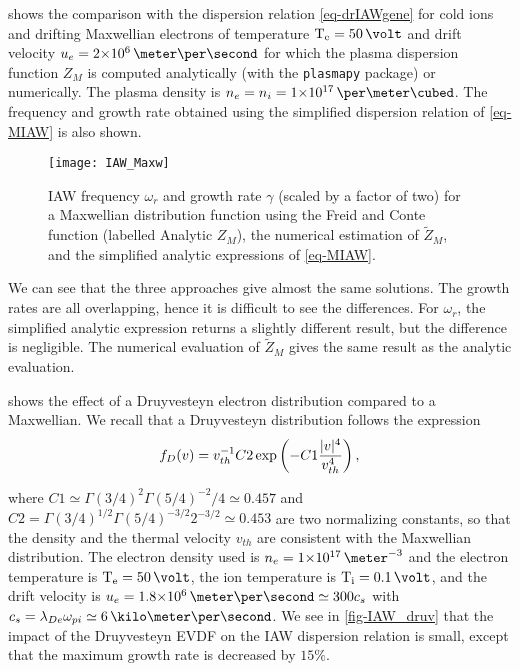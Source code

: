    shows the comparison with the dispersion relation \cref{eq-drIAWgene} for cold ions and drifting Maxwellian electrons of temperature $\Te=50\,\volt$ and drift velocity $u_e = \sn{2}{6} \,\meter\per\second$ for which the plasma dispersion function $Z_M$ is computed analytically (with the \texttt{plasmapy} package) or numerically.
  The plasma density is $n_e = n_i = \sn{1}{17} \,\per\meter\cubed$.
  The frequency and growth rate obtained using the simplified dispersion relation of \cref{eq-MIAW} is also shown. 
  
  \begin{figure}[hbt]
    \centering
    \texttt{[image: IAW\_Maxw]}
    \caption{IAW frequency $\omega_r$ and growth rate $\gamma$ (scaled by a factor of two) for a Maxwellian distribution function using the Freid and Conte function (labelled Analytic $Z_M$), the numerical estimation of $\tilde{Z}_M$, and the simplified analytic expressions of \cref{eq-MIAW}. }
    \label{fig-IAW_Maxw}
  \end{figure}
  
  We can see that the three approaches give almost the same solutions.
  The growth rates are all overlapping, hence it is difficult to see the differences.
  For $\omega_r$, the simplified analytic expression returns a slightly different result, but the difference is negligible.
  The numerical evaluation of $\tilde{Z}_M$ gives the same result as the analytic evaluation.
  
   shows the effect of a Druyvesteyn electron distribution compared to a Maxwellian.
  We recall that a Druyvesteyn distribution follows the expression
  \begin{equation} \label{eq-druyv}
    f_{D}(v) = v_{th}^{-1} C2 \exp \left( -C1 \frac{\lvert v\rvert^4}{v_{th}^4}  \right) ,
  \end{equation}
  
  where $C1 \simeq \Gamma(3/4)^2 \Gamma(5/4)^{-2}/4 \simeq 0.457 $ and $C2 =\Gamma(3/4)^{1/2} \Gamma(5/4)^{-3/2}2^{-3/2}  \simeq 0.453$ are two normalizing constants, so that the density and the thermal velocity $v_{th}$ are consistent with the Maxwellian distribution.
  The electron density used is $n_e=\sn{1}{17}\,\meter^{-3}$ and the electron temperature is $\Te=50\,\volt$, the ion temperature is $\Ti=0.1\,\volt$, and the drift velocity is $u_e=\sn{1.8}{6}\,\meter\per\second \simeq 300 c_s$ with $c_s=\lde \opi\simeq 6\,\kilo\meter\per\second$.
  We see in \cref{fig-IAW_druv} that the impact of the Druyvesteyn \ac{EVDF} on the \ac{IAW} dispersion relation is small, except that the maximum growth rate is decreased by $15\%$.
  

